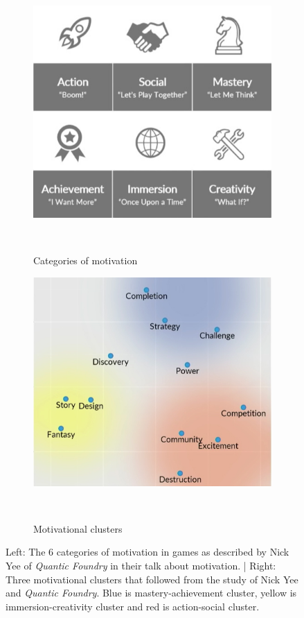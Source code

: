 \begin{figure}
	\centering
	\begin{subfigure}[b]{0.49\columnwidth}
		\centering
		\includegraphics[width=\textwidth]{./figures/motivation}
		\caption[motivation]{Categories of motivation}~\label{fig:gameMotivation}
	\end{subfigure}
	\begin{subfigure}[b]{0.49\columnwidth}
		\centering
		\includegraphics[width=\textwidth]{./figures/clusters}
		\caption[motivation]{Motivational clusters}~\label{fig:motivationClusters}
	\end{subfigure}
	\caption[]{Left: The 6 categories of motivation in games as described by Nick Yee of \textit{Quantic Foundry} in their talk about motivation. | Right: Three motivational clusters that followed from the study of Nick Yee and \textit{Quantic Foundry}. Blue is mastery-achievement cluster, yellow is immersion-creativity cluster and red is action-social cluster.~\footnotemark[6]}
\end{figure}

